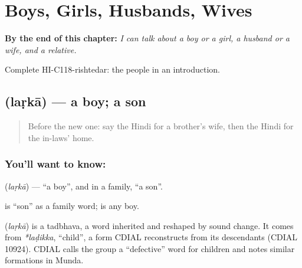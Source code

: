 
\chapter{Boys, Girls, Husbands, Wives}
\label{ch:hi-husbands-wives}

\begin{chapteropening}
\textbf{By the end of this chapter:} \emph{I can talk about a boy or a girl, a husband or a wife, and a relative.}

Complete HI-C118-rishtedar: the people in an introduction.
\end{chapteropening}

\section[\texorpdfstring{\hi{लड़का} (laṛkā)}{लड़का (laṛkā)}]{ (laṛkā) — a boy; a son}

\label{lesson:HI-C118-larka}



\begin{quote}
Before the new one: say the Hindi for a brother's wife, then the Hindi for the in-laws' home.
\end{quote}

\subsection*{You'll want to know: }
\textbf{} (\emph{laṛkā}) — \textquotedblleft{}a boy\textquotedblright{}, and in a family, \textquotedblleft{}a son\textquotedblright{}.

\textbf{} is \textquotedblleft{}son\textquotedblright{} as a family word; \textbf{} is any boy.

\begin{cousinweb}
\textbf{} (\emph{laṛkā}) is a tadbhava, a word inherited and reshaped by sound change. It comes from \emph{*laḍikka}, \textquotedblleft{}child\textquotedblright{}, a form CDIAL reconstructs from its descendants (CDIAL 10924). CDIAL calls the group a \textquotedblleft{}defective\textquotedblright{} word for children and notes similar formations in Munda.
\end{cousinweb}

